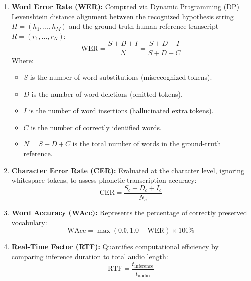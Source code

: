 \documentclass[12pt,oneside,letterpaper]{report}
\numberwithin{equation}{chapter} %
\begin{document}
\begin{enumerate}
    \item \textbf{Word Error Rate (WER):} Computed via Dynamic Programming (DP) Levenshtein distance alignment between the recognized hypothesis string $H = (h_1, \dots, h_M)$ and the ground-truth human reference transcript $R = (r_1, \dots, r_N)$:
    \begin{equation}
    \text{WER} = \frac{S + D + I}{N} = \frac{S + D + I}{S + D + C}
    \label{eq:wer_formula}
    \end{equation}
    Where:
    \begin{itemize}
        \item $S$ is the number of word substitutions (misrecognized tokens).
        \item $D$ is the number of word deletions (omitted tokens).
        \item $I$ is the number of word insertions (hallucinated extra tokens).
        \item $C$ is the number of correctly identified words.
        \item $N = S + D + C$ is the total number of words in the ground-truth reference.
    \end{itemize}

    \item \textbf{Character Error Rate (CER):} Evaluated at the character level, ignoring whitespace tokens, to assess phonetic transcription accuracy:
    \begin{equation}
    \text{CER} = \frac{S_c + D_c + I_c}{N_c}
    \label{eq:cer_formula}
    \end{equation}

    \item \textbf{Word Accuracy (WAcc):} Represents the percentage of correctly preserved vocabulary:
    \begin{equation}
    \text{WAcc} = \max\left(0.0, 1.0 - \text{WER}\right) \times 100\%
    \label{eq:wacc_formula}
    \end{equation}

    \item \textbf{Real-Time Factor (RTF):} Quantifies computational efficiency by comparing inference duration to total audio length:
    \begin{equation}
    \text{RTF} = \frac{t_{\text{inference}}}{t_{\text{audio}}}
    \label{eq:rtf_formula}
    \end{equation}
\end{enumerate}
\end{document}
